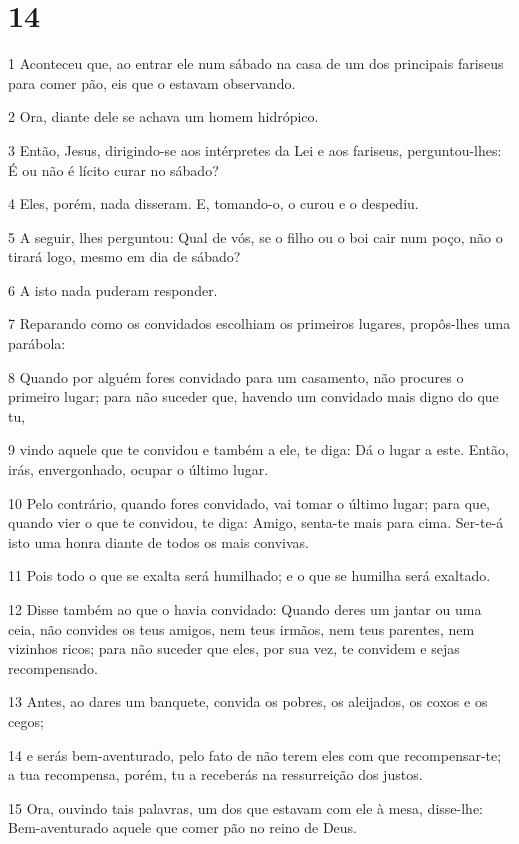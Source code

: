 \chapter{14}

\par 1 Aconteceu que, ao entrar ele num sábado na casa de um dos principais fariseus para comer pão, eis que o estavam observando.
\par 2 Ora, diante dele se achava um homem hidrópico.
\par 3 Então, Jesus, dirigindo-se aos intérpretes da Lei e aos fariseus, perguntou-lhes: É ou não é lícito curar no sábado?
\par 4 Eles, porém, nada disseram. E, tomando-o, o curou e o despediu.
\par 5 A seguir, lhes perguntou: Qual de vós, se o filho ou o boi cair num poço, não o tirará logo, mesmo em dia de sábado?
\par 6 A isto nada puderam responder.
\par 7 Reparando como os convidados escolhiam os primeiros lugares, propôs-lhes uma parábola:
\par 8 Quando por alguém fores convidado para um casamento, não procures o primeiro lugar; para não suceder que, havendo um convidado mais digno do que tu,
\par 9 vindo aquele que te convidou e também a ele, te diga: Dá o lugar a este. Então, irás, envergonhado, ocupar o último lugar.
\par 10 Pelo contrário, quando fores convidado, vai tomar o último lugar; para que, quando vier o que te convidou, te diga: Amigo, senta-te mais para cima. Ser-te-á isto uma honra diante de todos os mais convivas.
\par 11 Pois todo o que se exalta será humilhado; e o que se humilha será exaltado.
\par 12 Disse também ao que o havia convidado: Quando deres um jantar ou uma ceia, não convides os teus amigos, nem teus irmãos, nem teus parentes, nem vizinhos ricos; para não suceder que eles, por sua vez, te convidem e sejas recompensado.
\par 13 Antes, ao dares um banquete, convida os pobres, os aleijados, os coxos e os cegos;
\par 14 e serás bem-aventurado, pelo fato de não terem eles com que recompensar-te; a tua recompensa, porém, tu a receberás na ressurreição dos justos.
\par 15 Ora, ouvindo tais palavras, um dos que estavam com ele à mesa, disse-lhe: Bem-aventurado aquele que comer pão no reino de Deus.

